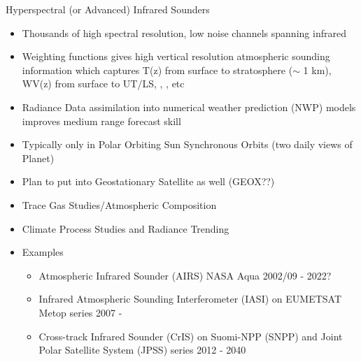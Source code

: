 \documentclass[10pt,t]{beamer}
\begin{document}
\begin{frame}[shrink=2]{Hyperspectral (or Advanced) Infrared Sounders}
\begin{itemize}
  \item Thousands of high spectral resolution, low noise channels spanning infrared
  \item Weighting functions gives high vertical resolution atmospheric sounding information which captures 
         T(z) from surface to stratosphere ($\sim$ 1 km), WV(z) from surface to UT/LS, \ozone, \cd, \methane etc
  \item Radiance Data assimilation into numerical weather prediction (NWP) models improves medium range forecast skill
  \item Typically only in Polar Orbiting Sun Synchronous Orbits (two daily views of Planet)
  \item Plan to put into Geostationary Satellite as well (GEOX??)
  \item Trace Gas Studies/Atmospheric Composition
  \item Climate Process Studies and Radiance Trending
  \item Examples
  \begin{itemize}
    \item Atmospheric Infrared Sounder (AIRS) NASA Aqua 2002/09 - 2022?
    \item Infrared Atmospheric Sounding Interferometer (IASI) on EUMETSAT Metop series 2007 - 
    \item Cross-track Infrared Sounder (CrIS) on Suomi-NPP (SNPP) and Joint Polar Satellite System (JPSS) series 2012 - 2040
  \end{itemize}
\end{itemize}
\end{frame}
\end{document}
